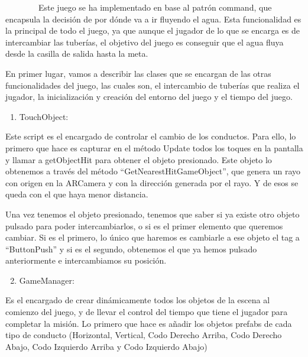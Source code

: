 \documentclass[]{article}
\begin{document}
~~~~~~~~Este juego se ha implementado en base al patrón command, que
encapsula la decisión de por dónde va a ir fluyendo el agua. Esta
funcionalidad es la principal de todo el juego, ya que aunque el jugador
de lo que se encarga es de intercambiar las tuberías, el objetivo del
juego es conseguir que el agua fluya desde la casilla de salida hasta la
meta.

En primer lugar, vamos a describir las clases que se encargan de las
otras funcionalidades del juego, las cuales son, el intercambio de
tuberías que realiza el jugador, la inicialización y creación del
entorno del juego y el tiempo del juego.

\begin{enumerate}
\itemsep1pt\parskip0pt
\item
  TouchObject:
\end{enumerate}

Este script es el encargado de controlar el cambio de los conductos.
Para ello, lo primero que hace es capturar en el método Update todos los
toques en la pantalla y llamar a getObjectHit para obtener el objeto
presionado. Este objeto lo obtenemos a través del método
``GetNearestHitGameObject'', que genera un rayo con origen en la
ARCamera y con la dirección generada por el rayo. Y de esos se queda con
el que haya menor distancia.

Una vez tenemos el objeto presionado, tenemos que saber si ya existe
otro objeto pulsado para poder intercambiarlos, o si es el primer
elemento que queremos cambiar. Si es el primero, lo único que haremos es
cambiarle a ese objeto el tag a ``ButtonPush'' y si es el segundo,
obtenemos el que ya hemos pulsado anteriormente e intercambiamos su
posición.

\begin{enumerate}
\setcounter{enumi}{1}
\itemsep1pt\parskip0pt
\item
  GameManager:~~~~~~~~
\end{enumerate}

Es el encargado de crear dinámicamente todos los objetos de la escena al
comienzo del juego, y de llevar el control del tiempo que tiene el
jugador para completar la misión. Lo primero que hace es añadir los
objetos prefabs de cada tipo de conducto (Horizontal, Vertical, Codo
Derecho Arriba, Codo Derecho Abajo, Codo Izquierdo Arriba y Codo
Izquierdo Abajo)
\end{document}
